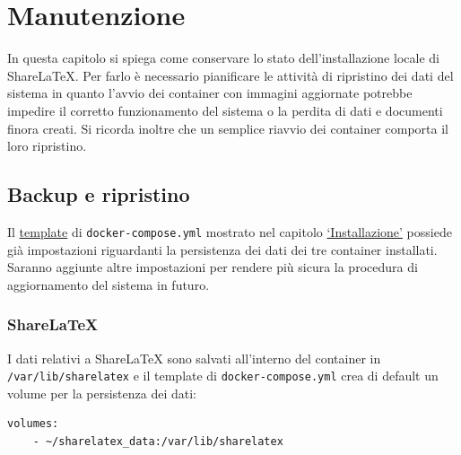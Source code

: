 \chapter{Manutenzione}
\label{Manutenzione}
\thispagestyle{empty}

In questa capitolo si spiega come conservare lo stato dell'installazione locale di ShareLaTeX. Per farlo è necessario pianificare le attività di ripristino dei dati del sistema in quanto l'avvio dei container con immagini aggiornate potrebbe impedire il corretto funzionamento del sistema o la perdita di dati e documenti finora creati. Si ricorda inoltre che un semplice riavvio dei container comporta il loro ripristino.

\section{Backup e ripristino}
Il \hyperref[code:docker-compose.yml]{template} di \verb|docker-compose.yml| mostrato nel capitolo \hyperref[Installazione]{\enquote*{Installazione}} possiede già impostazioni riguardanti la persistenza dei dati dei tre container installati. Saranno aggiunte altre impostazioni per rendere più sicura la procedura di aggiornamento del sistema in futuro.

\subsection{ShareLaTeX}
I dati relativi a ShareLaTeX sono salvati all'interno del container in \verb|/var/lib/sharelatex| e il template di \verb|docker-compose.yml| crea di default un volume per la persistenza dei dati:
\begin{lstlisting}
volumes:
    - ~/sharelatex_data:/var/lib/sharelatex
\end{lstlisting}

